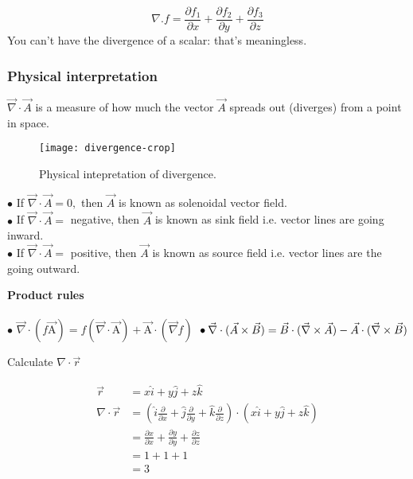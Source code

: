 $$ \nabla.f=\frac{\partial f_{1}}{\partial x}+\frac{\partial f_{2}}{\partial y}+\frac{\partial f_{3}}{\partial z}$$
You can't
have the divergence of a scalar: that’s meaningless.


\subsubsection{Physical interpretation}
$\vec{\nabla} \cdot \vec{A}$ is a measure of how much the vector $\vec{A}$ spreads out (diverges) from a point in space.
\begin{figure}[H]
	\begin{center}
		\texttt{[image: divergence-crop]}
	\end{center}
\caption{Physical intepretation of divergence.}
\end{figure}

\begin{note}
	$\bullet$ If $\vec{\nabla} \cdot \vec{A}=0,$ then $\vec{A}$ is known as solenoidal vector field.
	\\$\bullet$ If $\vec{\nabla} \cdot \vec{A}=$ negative, then $\vec{A}$ is known as sink field i.e. vector lines are going inward.
	\\$\bullet$ If $\vec{\nabla} \cdot \vec{A}=$ positive, then $\vec{A}$ is known as source field i.e. vector lines are the going outward.
\end{note}
\textbf{Product rules}\\\\$\bullet$ $\vec{\nabla} \cdot(f \overrightarrow{\mathrm{A}})=f(\vec{\nabla} \cdot \overrightarrow{\mathrm{A}})+\overrightarrow{\mathrm{A}} \cdot(\vec{\nabla} f)$
$\\\bullet \vec{\nabla} \cdot(\vec{A} \times \vec{B})=\vec{B} \cdot(\vec{\nabla} \times \vec{A})-\vec{A} \cdot(\vec{\nabla} \times \vec{B})$
\begin{exercise}
	 
	Calculate $\nabla \cdot \vec{ r}$\end{exercise}
	 \begin{answer}
	 
	 \begin{align*}
	 	\vec{ r}&=x\hat{i}+y\hat{j}+z\hat{k}\\
	 	\nabla \cdot \vec{ r} &=\left(\hat{i} \frac{\partial}{\partial x}+\hat{j} \frac{\partial}{\partial y}+\hat{k} \frac{\partial}{\partial z}\right) \cdot (x\hat{i}+y\hat{j}+z\hat{k})\\
	 	&=\frac{\partial x}{\partial x}+\frac{\partial y}{\partial y}+\frac{\partial z}{\partial z}\\
	 	&=1+1+1\\
	 	&=3
	 \end{align*}
	 
	 
	 \end{answer}
	 
